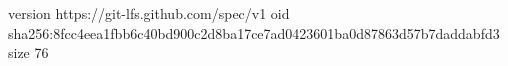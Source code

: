 version https://git-lfs.github.com/spec/v1
oid sha256:8fcc4eea1fbb6c40bd900c2d8ba17ce7ad0423601ba0d87863d57b7daddabfd3
size 76
